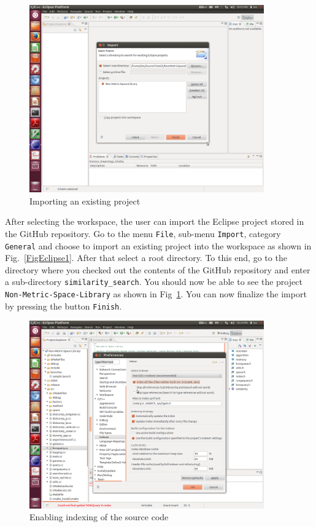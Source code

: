 \documentclass[runningheads,a4paper]{llncs}
\newcommand{\ttt}[1]{\texttt{#1}}
\begin{document}
{\begin{figure}
\caption{\label{FigEclipse2}Importing an existing project}
\includegraphics[width=0.9\textwidth]{figures/Eclipse2.pdf}
\end{figure}

After selecting the workspace, the user can import the Eclipse project
stored in the GitHub repository.
Go to the menu \ttt{File}, sub-menu \ttt{Import}, category \ttt{General} 
and choose to import
an existing project into the workspace as shown in Fig.~\ref{FigEclipse1}.
After that select a root directory. To this end,
go to the directory where you checked out the contents 
of the GitHub repository and enter a sub-directory \ttt{similarity\_search}.
You should now be able to see the project \ttt{Non-Metric-Space-Library}
as shown in Fig~\ref{FigEclipse2}.
You can now finalize the import by pressing the button \ttt{Finish}.

\begin{figure}
\caption{\label{FigEclipse3}Enabling indexing of the source code}
\includegraphics[width=0.9\textwidth]{figures/Eclipse3.pdf}
\end{figure}

}
\end{document}
